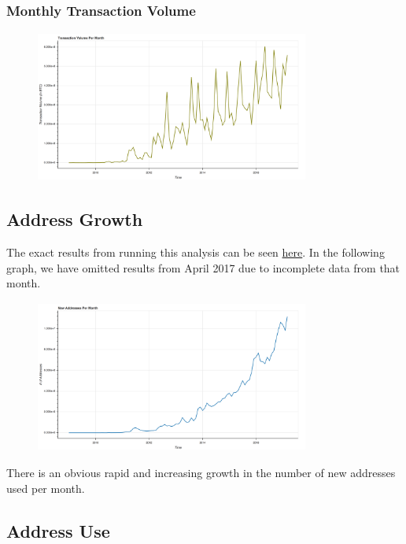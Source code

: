 \documentclass[9pt,twocolumn,twoside]{idsi}
\begin{document}
\subsubsection{Monthly Transaction Volume}
\begin{figure}[!ht]
\includegraphics[width=9cm, height=5cm]{data/output/general/monthly_transaction_volume.png}
\end{figure}

\subsection{Address Growth}

The exact results from running this analysis can be seen \href{https://github.com/nishilshah17/idsi_bitcoin/blob/44ec93f337bdf620b56f4343650f2a572aca2cb4/data/output/new_addresses/new_addresses.txt}{here}. In the following graph, we have omitted results from April 2017 due to incomplete data from that month.

\begin{figure}[!ht]
\includegraphics[width=9cm, height=5cm]{data/output/new_addresses/new_addresses.png}
\end{figure}

There is an obvious rapid and increasing growth in the number of new addresses used per month.

\subsection{Address Use}
\end{document}
